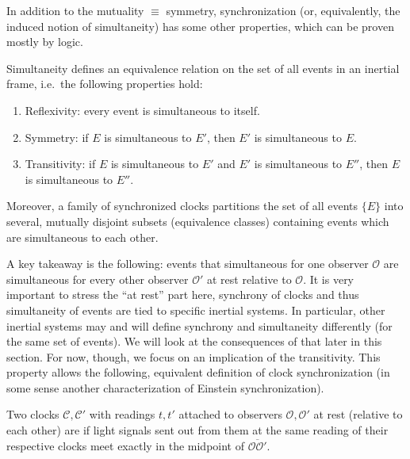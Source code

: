 \documentclass[../relativity_main.tex]{subfiles}
\begin{document}
In addition to the mutuality $\equiv$ symmetry, synchronization (or, equivalently, the induced notion of simultaneity) has some other properties, which can be proven mostly by logic.
\begin{prop}\label{prop:simult_equiv_relation}
	Simultaneity defines an equivalence relation on the set of all events in an inertial frame, i.e.~the following properties hold:
	\begin{enumerate}
		\item Reflexivity: every event is simultaneous to itself.
		
		\item Symmetry: if $E$ is simultaneous to $E'$, then $E'$ is simultaneous to $E$.
		
		\item Transitivity: if $E$ is simultaneous to $E'$ and $E'$ is simultaneous to $E''$, then $E$ is simultaneous to $E''$.
	\end{enumerate}
	
	Moreover, a family of synchronized clocks partitions the set of all events $\{E\}$ into several, mutually disjoint subsets (equivalence classes) containing events which are simultaneous to each other.
\end{prop}
A key takeaway is the following: events that simultaneous for one observer $\mathcal{O}$ are simultaneous for every other observer $\mathcal{O}'$ at rest relative to $\mathcal{O}$. It is very important to stress the \enquote{at rest} part here, synchrony of clocks and thus simultaneity of events are tied to specific inertial systems. In particular, other inertial systems may and will define synchrony and simultaneity differently (for the same set of events). We will look at the consequences of that later in this section. For now, though, we focus on an implication of the transitivity. This property allows the following, equivalent definition of clock synchronization (in some sense another characterization of Einstein synchronization).
\begin{defi}\label{defi:synchrony_2}
	Two clocks $\mathcal{C}, \mathcal{C}'$ with readings $t, t'$ attached to observers $\mathcal{O}, \mathcal{O}'$ at rest (relative to each other) are  if light signals sent out from them at the same reading of their respective clocks meet exactly in the midpoint of $\overline{\mathcal{O} \mathcal{O}'}$.
\end{defi}
\end{document}
